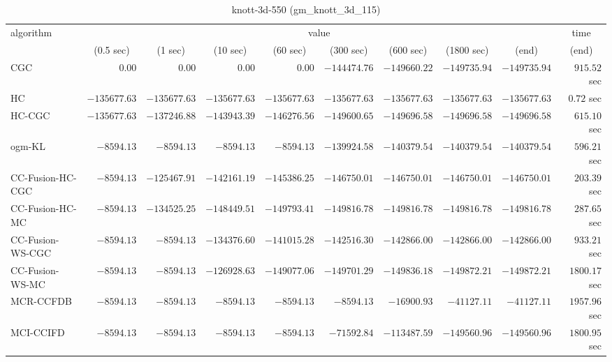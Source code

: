 \begin{table}[H]
\scriptsize
\centering
\caption{knott-3d-550 (gm\_knott\_3d\_115)}
\label{tab:anytimetable-knott-3d-550-gm-knott-3d-115}
\begin{tabular}{lrrrrrrrrr}
\toprule
           algorithm &                                   \multicolumn{8}{c}{value} & \multicolumn{1}{c}{time}   \\  
\cmidrule(lr){2-9}\cmidrule(lr){10-10}   
                     & \multicolumn{1}{c}{(0.5 sec)} & \multicolumn{1}{c}{(1 sec)} & \multicolumn{1}{c}{(10 sec)} & \multicolumn{1}{c}{(60 sec)} & \multicolumn{1}{c}{(300 sec)} & \multicolumn{1}{c}{(600 sec)} & \multicolumn{1}{c}{(1800 sec)} & \multicolumn{1}{c}{(end)} & \multicolumn{1}{c}{(end)}   \\ \midrule 
                 CGC & $         0.00$ & $         0.00$ & $         0.00$ & $         0.00$ & $   -144474.76$ & $   -149660.22$ & $   -149735.94$ & $   -149735.94$ & $       915.52$ sec   \\ 
                  HC & $   -135677.63$ & $   -135677.63$ & $   -135677.63$ & $   -135677.63$ & $   -135677.63$ & $   -135677.63$ & $   -135677.63$ & $   -135677.63$ & $         0.72$ sec   \\ 
              HC-CGC & $   -135677.63$ & $   -137246.88$ & $   -143943.39$ & $   -146276.56$ & $   -149600.65$ & $   -149696.58$ & $   -149696.58$ & $   -149696.58$ & $       615.10$ sec   \\ 
              ogm-KL & $     -8594.13$ & $     -8594.13$ & $     -8594.13$ & $     -8594.13$ & $   -139924.58$ & $   -140379.54$ & $   -140379.54$ & $   -140379.54$ & $       596.21$ sec   \\ 
    CC-Fusion-HC-CGC & $     -8594.13$ & $   -125467.91$ & $   -142161.19$ & $   -145386.25$ & $   -146750.01$ & $   -146750.01$ & $   -146750.01$ & $   -146750.01$ & $       203.39$ sec   \\ 
     CC-Fusion-HC-MC & $     -8594.13$ & $   -134525.25$ & $   -148449.51$ & $   -149793.41$ & $   -149816.78$ & $   -149816.78$ & $   -149816.78$ & $   -149816.78$ & $       287.65$ sec   \\ 
    CC-Fusion-WS-CGC & $     -8594.13$ & $     -8594.13$ & $   -134376.60$ & $   -141015.28$ & $   -142516.30$ & $   -142866.00$ & $   -142866.00$ & $   -142866.00$ & $       933.21$ sec   \\ 
     CC-Fusion-WS-MC & $     -8594.13$ & $     -8594.13$ & $   -126928.63$ & $   -149077.06$ & $   -149701.29$ & $   -149836.18$ & $   -149872.21$ & $   -149872.21$ & $      1800.17$ sec   \\ 
\cmidrule{1-1} 
           MCR-CCFDB & $     -8594.13$ & $     -8594.13$ & $     -8594.13$ & $     -8594.13$ & $     -8594.13$ & $    -16900.93$ & $    -41127.11$ & $    -41127.11$ & $      1957.96$ sec   \\ 
\cmidrule{1-1} 
           MCI-CCIFD & $     -8594.13$ & $     -8594.13$ & $     -8594.13$ & $     -8594.13$ & $    -71592.84$ & $   -113487.59$ & $   -149560.96$ & $   -149560.96$ & $      1800.95$ sec   \\ 
\bottomrule
\end{tabular}
\end{table}


